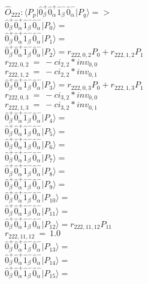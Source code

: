 \documentclass[14pt]{article}
\begin{document}
    $\hat{O}_{222}:  \langle{P_p}\vert \hat{0}_{\beta}^{+}\hat{0}_{\alpha}^{+}\hat{1}_{\beta}^{-}\hat{0}_{\alpha}^{-} \vert{P_q}\rangle => $ \\ 
    $ \hat{0}_{\beta}^{+}\hat{0}_{\alpha}^{+}\hat{1}_{\beta}^{-}\hat{0}_{\alpha}^{-} \vert{P_{0}}\rangle =  $ \\ 
    $ \hat{0}_{\beta}^{+}\hat{0}_{\alpha}^{+}\hat{1}_{\beta}^{-}\hat{0}_{\alpha}^{-} \vert{P_{1}}\rangle =  $ \\ 
    $ \hat{0}_{\beta}^{+}\hat{0}_{\alpha}^{+}\hat{1}_{\beta}^{-}\hat{0}_{\alpha}^{-} \vert{P_{2}}\rangle = {r}_{222,0,2}P_{0}+{r}_{222,1,2}P_{1} $ \\ 
    ${r}_{222,0,2}\ =\ -{ci}_{2,2}*{inv}_{0,0} $ \\ 
    ${r}_{222,1,2}\ =\ -{ci}_{2,2}*{inv}_{0,1} $ \\ 
    $ \hat{0}_{\beta}^{+}\hat{0}_{\alpha}^{+}\hat{1}_{\beta}^{-}\hat{0}_{\alpha}^{-} \vert{P_{3}}\rangle = {r}_{222,0,3}P_{0}+{r}_{222,1,3}P_{1} $ \\ 
    ${r}_{222,0,3}\ =\ -{ci}_{3,2}*{inv}_{0,0} $ \\ 
    ${r}_{222,1,3}\ =\ -{ci}_{3,2}*{inv}_{0,1} $ \\ 
    $ \hat{0}_{\beta}^{+}\hat{0}_{\alpha}^{+}\hat{1}_{\beta}^{-}\hat{0}_{\alpha}^{-} \vert{P_{4}}\rangle =  $ \\ 
    $ \hat{0}_{\beta}^{+}\hat{0}_{\alpha}^{+}\hat{1}_{\beta}^{-}\hat{0}_{\alpha}^{-} \vert{P_{5}}\rangle =  $ \\ 
    $ \hat{0}_{\beta}^{+}\hat{0}_{\alpha}^{+}\hat{1}_{\beta}^{-}\hat{0}_{\alpha}^{-} \vert{P_{6}}\rangle =  $ \\ 
    $ \hat{0}_{\beta}^{+}\hat{0}_{\alpha}^{+}\hat{1}_{\beta}^{-}\hat{0}_{\alpha}^{-} \vert{P_{7}}\rangle =  $ \\ 
    $ \hat{0}_{\beta}^{+}\hat{0}_{\alpha}^{+}\hat{1}_{\beta}^{-}\hat{0}_{\alpha}^{-} \vert{P_{8}}\rangle =  $ \\ 
    $ \hat{0}_{\beta}^{+}\hat{0}_{\alpha}^{+}\hat{1}_{\beta}^{-}\hat{0}_{\alpha}^{-} \vert{P_{9}}\rangle =  $ \\ 
    $ \hat{0}_{\beta}^{+}\hat{0}_{\alpha}^{+}\hat{1}_{\beta}^{-}\hat{0}_{\alpha}^{-} \vert{P_{10}}\rangle =  $ \\ 
    $ \hat{0}_{\beta}^{+}\hat{0}_{\alpha}^{+}\hat{1}_{\beta}^{-}\hat{0}_{\alpha}^{-} \vert{P_{11}}\rangle =  $ \\ 
    $ \hat{0}_{\beta}^{+}\hat{0}_{\alpha}^{+}\hat{1}_{\beta}^{-}\hat{0}_{\alpha}^{-} \vert{P_{12}}\rangle = {r}_{222,11,12}P_{11} $ \\ 
    ${r}_{222,11,12}\ =\ 1.0 $ \\ 
    $ \hat{0}_{\beta}^{+}\hat{0}_{\alpha}^{+}\hat{1}_{\beta}^{-}\hat{0}_{\alpha}^{-} \vert{P_{13}}\rangle =  $ \\ 
    $ \hat{0}_{\beta}^{+}\hat{0}_{\alpha}^{+}\hat{1}_{\beta}^{-}\hat{0}_{\alpha}^{-} \vert{P_{14}}\rangle =  $ \\ 
    $ \hat{0}_{\beta}^{+}\hat{0}_{\alpha}^{+}\hat{1}_{\beta}^{-}\hat{0}_{\alpha}^{-} \vert{P_{15}}\rangle =  $ \\ 
    
\end{document}
